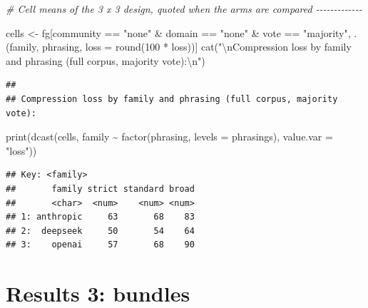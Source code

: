 \documentclass[
  11pt,
]{article}
\newenvironment{Shaded}{\begin{snugshade}}{\end{snugshade}}
\newcommand{\AttributeTok}[1]{\textcolor[rgb]{0.77,0.63,0.00}{#1}}
\newcommand{\CommentTok}[1]{\textcolor[rgb]{0.56,0.35,0.01}{\textit{#1}}}
\newcommand{\DecValTok}[1]{\textcolor[rgb]{0.00,0.00,0.81}{#1}}
\newcommand{\FunctionTok}[1]{\textcolor[rgb]{0.00,0.00,0.00}{#1}}
\newcommand{\NormalTok}[1]{#1}
\newcommand{\OtherTok}[1]{\textcolor[rgb]{0.56,0.35,0.01}{#1}}
\newcommand{\SpecialCharTok}[1]{\textcolor[rgb]{0.00,0.00,0.00}{#1}}
\newcommand{\StringTok}[1]{\textcolor[rgb]{0.31,0.60,0.02}{#1}}
\begin{document}
\begin{Shaded}
\begin{Highlighting}[]
\CommentTok{\# Cell means of the 3 x 3 design, quoted when the arms are compared {-}{-}{-}{-}{-}{-}{-}{-}{-}{-}{-}{-}{-}}

\NormalTok{cells }\OtherTok{\textless{}{-}}\NormalTok{ fg[community }\SpecialCharTok{==} \StringTok{"none"} \SpecialCharTok{\&}\NormalTok{ domain }\SpecialCharTok{==} \StringTok{"none"} \SpecialCharTok{\&}\NormalTok{ vote }\SpecialCharTok{==} \StringTok{"majority"}\NormalTok{,}
\NormalTok{            .(family, phrasing, }\AttributeTok{loss =} \FunctionTok{round}\NormalTok{(}\DecValTok{100} \SpecialCharTok{*}\NormalTok{ loss))]}
\FunctionTok{cat}\NormalTok{(}\StringTok{"}\SpecialCharTok{\textbackslash{}n}\StringTok{Compression loss by family and phrasing (full corpus, majority vote):}\SpecialCharTok{\textbackslash{}n}\StringTok{"}\NormalTok{)}
\end{Highlighting}
\end{Shaded}

\begin{verbatim}
## 
## Compression loss by family and phrasing (full corpus, majority vote):
\end{verbatim}

\begin{Shaded}
\begin{Highlighting}[]
\FunctionTok{print}\NormalTok{(}\FunctionTok{dcast}\NormalTok{(cells, family }\SpecialCharTok{\textasciitilde{}} \FunctionTok{factor}\NormalTok{(phrasing, }\AttributeTok{levels =}\NormalTok{ phrasings),}
            \AttributeTok{value.var =} \StringTok{"loss"}\NormalTok{))}
\end{Highlighting}
\end{Shaded}

\begin{verbatim}
## Key: <family>
##       family strict standard broad
##       <char>  <num>    <num> <num>
## 1: anthropic     63       68    83
## 2:  deepseek     50       54    64
## 3:    openai     57       68    90
\end{verbatim}

\hypertarget{results-3-bundles}{%
\section{Results 3: bundles}\label{results-3-bundles}}
\end{document}
